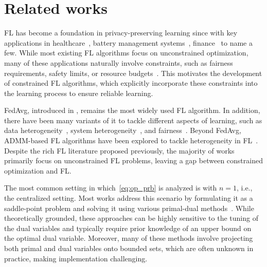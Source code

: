 \documentclass{article} %
\begin{document}
\section{Related works}
\label{apdx:rel}
FL has become a foundation in privacy-preserving learning since \citet{mcmahan2017communication} with key applications in healthcare~\citep{rieke2020future, peng2024depth}, battery management systems~\citep{wang2024adaptive,zhu2024collaborative,banabilah2022federated}, finance~\citep{wen2023survey,chatterjee2023federated} to name a few. While most existing FL algorithms focus on unconstrained optimization, many of these applications naturally involve constraints, such as fairness requirements, safety limits, or resource budgets~\citep{du2021fairness,huang2024federated,zhang2024unified,salehi2021federated,yang2022federated}. This motivates the development of constrained FL algorithms, which explicitly incorporate these constraints into the learning process to ensure reliable learning.

FedAvg, introduced in \citet{mcmahan2017communication}, remains the most widely used FL algorithm. In addition, there have been many variants of it to tackle different aspects of learning, such as data heterogeneity~\citep{karimireddy2020scaffold,seo2024relaxed,morafah2024towards}, system heterogeneity~\citep{gong2022fedadmm,li2020federated,wu2024fedbiot}, and fairness~\citep{li2021ditto,badar2024fairtrade}. Beyond FedAvg, ADMM-based FL algorithms have been explored to tackle heterogeneity in FL~\citet{acar2021federated,gong2022fedadmm,zhou2023federated}. Despite the rich FL literature proposed previously, the majority of works primarily focus on unconstrained FL problems, leaving a gap between constrained optimization and FL.

The most common setting in which~\ref{eq:op_prb} is analyzed is with $n=1$, i.e., the centralized setting. Most works address this scenario by formulating it as a saddle-point problem and solving it using various primal-dual methods~\citep{nemirovski2004prox,chambolle2011first,bertsekas2014constrained,hamedani2021primal,zhang2022solving,hounie2023resilient,boob2024optimal}. While theoretically grounded, these approaches can be highly sensitive to the tuning of the dual variables and typically require prior knowledge of an upper bound on the optimal dual variable. Moreover, many of these methods involve projecting both primal and dual variables onto bounded sets, which are often unknown in practice, making implementation challenging.
\end{document}
